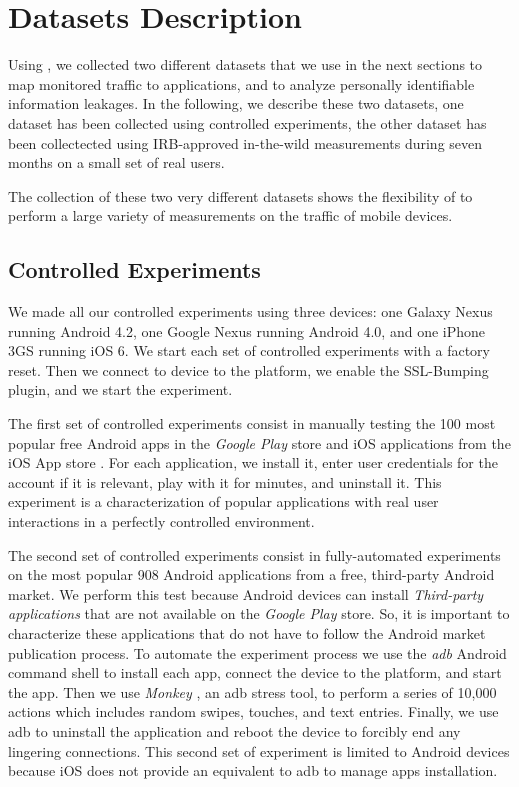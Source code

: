 \section{Datasets Description}
\label{sec:dataset}
Using \platname, we collected two different datasets that we use in
the next sections to map monitored traffic to applications, and to
analyze personally identifiable information leakages. In the
following, we describe these two datasets, one dataset has been
collected using controlled experiments, the other dataset has been
collectected using IRB-approved in-the-wild measurements during seven
months on a small set of real users.

The collection of these two very different datasets shows the
flexibility of \platname{} to perform a large variety of measurements
on the traffic of mobile devices.

\subsection{Controlled Experiments}
\label{sec:dataset-contr-exper}
We made all our controlled experiments using three devices: one Galaxy
Nexus running Android 4.2, one Google Nexus running Android 4.0, and
one iPhone 3GS running iOS 6. We start each set of controlled experiments
 with a factory reset. Then we connect to device to the
\platname{} platform, we enable the SSL-Bumping plugin, and we start
the experiment. 

The first set of controlled experiments consist in manually testing the
100 most popular free Android apps in the \emph{Google Play} store and \tbd{}
iOS applications from the iOS App store . For each
application, we install it, enter user credentials for the account if
it is relevant, play with it for \tbd{} minutes, and uninstall
it. This experiment is a characterization of popular applications with
real user interactions in a perfectly controlled environment. 

The second set of controlled experiments consist in fully-automated
experiments on the most popular 908 Android applications from a free,
third-party Android market.
We perform this test because Android devices can install
\emph{Third-party applications} that are not available on the
\emph{Google Play} store. So, it is important to characterize these
applications that do not have to follow the Android market publication
process. To
automate the experiment process we use the \emph{adb} Android command shell to
install each app, connect the device to the \platname{} platform, and
start the app. Then we use \emph{Monkey} , an adb
stress tool, to perform a series of 10,000 actions which includes
random swipes, touches, and text entries.  Finally, we use adb to
uninstall the application and reboot the device to forcibly end any
lingering connections. This second set of experiment is limited to
Android devices because iOS does not provide an equivalent to adb to
manage apps installation. 

